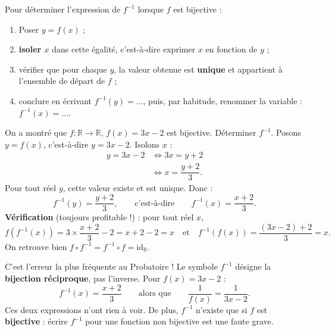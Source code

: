 \documentclass[11pt]{article}
\begin{document}
\begin{methode}
Pour déterminer l'expression de $f^{-1}$ lorsque $f$ est bijective :
\begin{enumerate}
\item Poser $y = f(x)$ ;
\item \textbf{isoler $x$} dans cette égalité, c'est-à-dire exprimer $x$ en fonction de $y$ ;
\item vérifier que pour chaque $y$, la valeur obtenue est \textbf{unique} et appartient à l'ensemble de départ de $f$ ;
\item conclure en écrivant $f^{-1}(y) = \ldots$, puis, par habitude, renommer la variable : $f^{-1}(x) = \ldots$.
\end{enumerate}
\end{methode}

\begin{exoresolu}
On a montré que $f : \mathbb{R} \to \mathbb{R}$, $f(x) = 3x - 2$ est bijective. Déterminer $f^{-1}$.
\tcblower
Posons $y = f(x)$, c'est-à-dire $y = 3x - 2$. Isolons $x$ :
\begin{align*}
y = 3x - 2 &\iff 3x = y + 2 \\
&\iff x = \dfrac{y + 2}{3}.
\end{align*}
Pour tout réel $y$, cette valeur existe et est unique. Donc :
\[ f^{-1}(y) = \dfrac{y + 2}{3}, \qquad \text{c'est-à-dire} \qquad \boxed{f^{-1}(x) = \dfrac{x + 2}{3}}. \]
\textbf{Vérification} (toujours profitable !) : pour tout réel $x$,
\[ f\left(f^{-1}(x)\right) = 3 \times \dfrac{x+2}{3} - 2 = x + 2 - 2 = x \quad \text{et} \quad f^{-1}\left(f(x)\right) = \dfrac{(3x-2)+2}{3} = x. \]
On retrouve bien $f \circ f^{-1} = f^{-1} \circ f = \mathrm{id}_{\mathbb{R}}$.
\end{exoresolu}

\begin{attention}
C'est l'erreur la plus fréquente au Probatoire ! Le symbole $f^{-1}$ désigne la \textbf{bijection réciproque}, pas l'inverse. Pour $f(x) = 3x - 2$ :
\[ f^{-1}(x) = \dfrac{x+2}{3} \qquad \text{alors que} \qquad \dfrac{1}{f(x)} = \dfrac{1}{3x-2}. \]
Ces deux expressions n'ont rien à voir. De plus, $f^{-1}$ n'existe que si $f$ est \textbf{bijective} : écrire $f^{-1}$ pour une fonction non bijective est une faute grave.
\end{attention}
\end{document}
